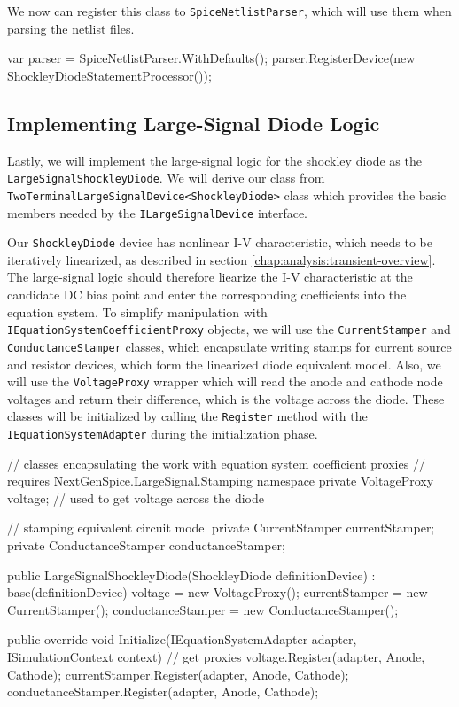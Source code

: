We now can register this class to \texttt{SpiceNetlistParser}, which will use them when parsing the netlist files.

\begin{csharpcode}
var parser =  SpiceNetlistParser.WithDefaults();
parser.RegisterDevice(new ShockleyDiodeStatementProcessor());
\end{csharpcode}

\subsection{Implementing Large-Signal Diode Logic}
Lastly, we will implement the large-signal logic for the shockley diode as the \texttt{LargeSignalShockleyDiode}. We will derive our class from \texttt{TwoTerminalLarge\+SignalDevice<ShockleyDiode>} class which provides the basic members needed by the \texttt{ILargeSignalDevice} interface.

Our \texttt{ShockleyDiode} device has nonlinear I-V characteristic, which needs to be iteratively linearized, as described in section \ref{chap:analysis:transient-overview}. The large-signal logic should therefore liearize the I-V characteristic at the candidate DC bias point and enter the corresponding coefficients into the equation system. To simplify manipulation with \texttt{IEquationSystemCoefficientProxy} objects, we will use the \texttt{CurrentStamper} and \texttt{ConductanceStamper} classes, which encapsulate writing stamps for current source and resistor devices, which form the linearized diode equivalent model. Also, we will use the \texttt{VoltageProxy} wrapper which will read the anode and cathode node voltages and return their difference, which is the voltage across the diode. These classes will be initialized by calling the \texttt{Register} method with the \texttt{IEquationSystemAdapter} during the initialization phase.

\begin{csharpcode}
	// classes encapsulating the work with equation system coefficient proxies
	// requires NextGenSpice.LargeSignal.Stamping namespace
	private VoltageProxy voltage; // used to get voltage across the diode
	
	// stamping equivalent circuit model
	private CurrentStamper currentStamper;
	private ConductanceStamper conductanceStamper;
	
	public LargeSignalShockleyDiode(ShockleyDiode definitionDevice)
		: base(definitionDevice)
	{
		voltage = new VoltageProxy();
		currentStamper = new CurrentStamper();
		conductanceStamper = new ConductanceStamper();
	}
	
	public override void Initialize(IEquationSystemAdapter adapter,
	ISimulationContext context)
	{
		// get proxies
		voltage.Register(adapter, Anode, Cathode);
		currentStamper.Register(adapter, Anode, Cathode);
		conductanceStamper.Register(adapter, Anode, Cathode);
	}
\end{csharpcode}

